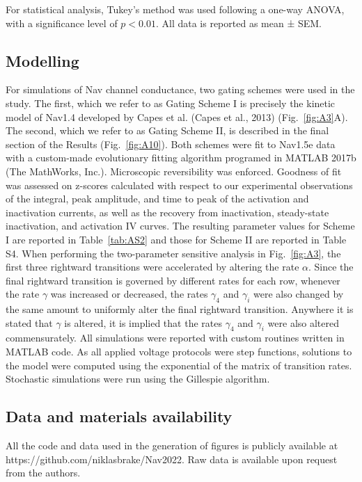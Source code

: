For statistical analysis, Tukey’s method was used following a one-way ANOVA, with a significance level of $p<0.01$. All data is reported as mean ± SEM. 

\subsection{Modelling}
For simulations of Nav channel conductance, two gating schemes were used in the study. The first, which we refer to as Gating Scheme I is precisely the kinetic model of Nav1.4 developed by Capes et al. (Capes et al., 2013) (Fig.~\ref{fig:A3}A). The second, which we refer to as Gating Scheme II, is described in the final section of the Results (Fig.~\ref{fig:A10}). Both schemes were fit to Nav1.5e data with a custom-made evolutionary fitting algorithm programed in MATLAB 2017b (The MathWorks, Inc.). Microscopic reversibility was enforced. Goodness of fit was assessed on z-scores calculated with respect to our experimental observations of the integral, peak amplitude, and time to peak of the activation and inactivation currents, as well as the recovery from inactivation, steady-state inactivation, and activation IV curves. The resulting parameter values for Scheme I are reported in Table~\ref{tab:AS2} and those for Scheme II are reported in Table S4.
When performing the two-parameter sensitive analysis in Fig.~\ref{fig:A3}, the first three rightward transitions were accelerated by altering the rate $\alpha$. Since the final rightward transition is governed by different rates for each row, whenever the rate $\gamma$ was increased or decreased, the rates $\gamma_4$ and $\gamma_i$ were also changed by the same amount to uniformly alter the final rightward transition. Anywhere it is stated that $\gamma$ is altered, it is implied that the rates $\gamma_4$ and $\gamma_i$ were also altered commensurately.
All simulations were reported with custom routines written in MATLAB code. As all applied voltage protocols were step functions, solutions to the model were computed using the exponential of the matrix of transition rates. Stochastic simulations were run using the Gillespie algorithm. 	

\subsection{Data and materials availability}
All the code and data used in the generation of figures is publicly available at https://github.com/niklasbrake/Nav2022. Raw data is available upon request from the authors.

